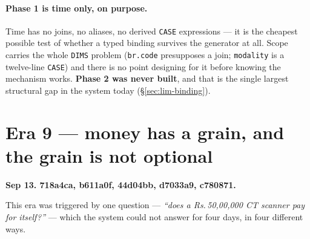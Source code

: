 \documentclass[11pt,a4paper]{report}
\newcommand{\rs}[1]{Rs.\,#1}
\newcommand{\code}[1]{\texttt{\small #1}}
\newcommand{\sha}[1]{{\ttfamily\small\color{slate}#1}}
\begin{document}
\paragraph{Phase 1 is time only, on purpose.} Time has no joins, no aliases, no derived
\code{CASE} expressions --- it is the cheapest possible test of whether a typed binding survives
the generator at all. Scope carries the whole \code{DIMS} problem (\code{br.code} presupposes a
join; \code{modality} is a twelve-line \code{CASE}) and there is no point designing for it before
knowing the mechanism works. \textbf{Phase 2 was never built}, and that is the single largest
structural gap in the system today (\S\ref{sec:lim-binding}).

\section{Era 9 --- money has a grain, and the grain is not optional}
\label{sec:era9}

\textbf{Sep 13. \sha{718a4ca}, \sha{b611a0f}, \sha{44d04bb}, \sha{d7033a9}, \sha{c780871}.}

This era was triggered by one question --- \emph{``does a \rs{50,00,000} CT scanner pay for
itself?''} --- which the system could not answer for four days, in four different ways.
\end{document}
